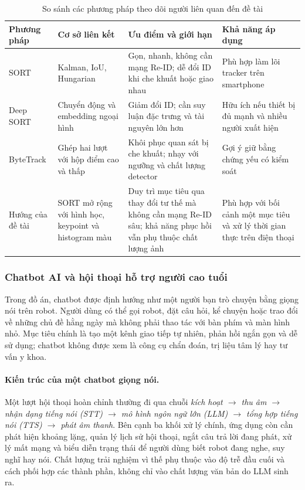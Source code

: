 \begin{table}[H]
\centering
\caption{So sánh các phương pháp theo dõi người liên quan đến đề tài}
\label{tab:tracking_related}
\small
\begin{tabularx}{\textwidth}{|p{2.2cm}|p{3.0cm}|X|X|}
\hline
\textbf{Phương pháp} & \textbf{Cơ sở liên kết} & \textbf{Ưu điểm và giới hạn} & \textbf{Khả năng áp dụng} \\
\hline
SORT & Kalman, IoU, Hungarian & Gọn, nhanh, không cần mạng Re-ID; dễ đổi ID khi che khuất hoặc giao nhau & Phù hợp làm lõi tracker trên smartphone \\
\hline
Deep SORT & Chuyển động và embedding ngoại hình & Giảm đổi ID; cần suy luận đặc trưng và tài nguyên lớn hơn & Hữu ích nếu thiết bị đủ mạnh và nhiều người xuất hiện \\
\hline
ByteTrack & Ghép hai lượt với hộp điểm cao và thấp & Khôi phục quan sát bị che khuất; nhạy với ngưỡng và chất lượng detector & Gợi ý giữ bằng chứng yếu có kiểm soát \\
\hline
Hướng của đề tài & SORT mở rộng với hình học, keypoint và histogram màu & Duy trì mục tiêu qua thay đổi tư thế mà không cần mạng Re-ID sâu; khả năng phục hồi vẫn phụ thuộc chất lượng ảnh & Phù hợp với bối cảnh một mục tiêu và xử lý thời gian thực trên điện thoại \\
\hline
\end{tabularx}
\end{table}

\subsubsection{Chatbot AI và hội thoại hỗ trợ người cao tuổi}

Trong đồ án, chatbot được định hướng như một người bạn trò chuyện bằng giọng nói trên robot. Người dùng có thể gọi robot, đặt câu hỏi, kể chuyện hoặc trao đổi về những chủ đề hằng ngày mà không phải thao tác với bàn phím và màn hình nhỏ. Mục tiêu chính là tạo một kênh giao tiếp tự nhiên, phản hồi ngắn gọn và dễ sử dụng; chatbot không được xem là công cụ chẩn đoán, trị liệu tâm lý hay tư vấn y khoa.

\paragraph{Kiến trúc của một chatbot giọng nói.}
Một lượt hội thoại hoàn chỉnh thường đi qua chuỗi \textit{kích hoạt $\rightarrow$ thu âm $\rightarrow$ nhận dạng tiếng nói (STT) $\rightarrow$ mô hình ngôn ngữ lớn (LLM) $\rightarrow$ tổng hợp tiếng nói (TTS) $\rightarrow$ phát âm thanh}. Bên cạnh ba khối xử lý chính, ứng dụng còn cần phát hiện khoảng lặng, quản lý lịch sử hội thoại, ngắt câu trả lời đang phát, xử lý mất mạng và biểu diễn trạng thái để người dùng biết robot đang nghe, suy nghĩ hay nói. Chất lượng trải nghiệm vì thế phụ thuộc vào độ trễ đầu cuối và cách phối hợp các thành phần, không chỉ vào chất lượng văn bản do LLM sinh ra.

